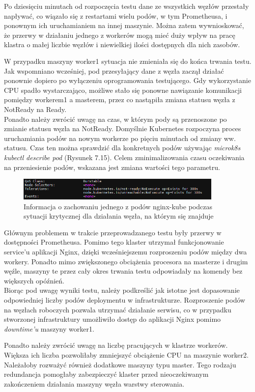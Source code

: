 Po dziesięciu minutach od rozpoczęcia testu dane ze wszystkich węzłów przestały napływać, co wiązało się z restartami wielu podów, w tym Prometheusa, i ponownym ich uruchamianiem na innej maszynie. 
Można zatem wywnioskować, że przerwy w działaniu jednego z workerów mogą mieć duży wpływ na pracę klastra o małej liczbie węzłów i niewielkiej ilości dostępnych dla nich zasobów. 

W przypadku maszyny worker1 sytuacja nie zmieniała się do końca trwania testu. Jak wspomniano wcześniej, pod przesyłający dane z węzła zaczął działać ponownie dopiero po wyłączeniu oprogramowania testującego. Gdy wykorzystanie CPU spadło wystarczająco, możliwe stało się ponowne nawiązanie komunikacji pomiędzy workerem1 a masterem, przez co nastąpiła zmiana statusu węzła z NotReady na Ready.\\

Ponadto należy zwrócić uwagę na czas, w którym pody są przenoszone po zmianie statusu węzła na NotReady. Domyślnie Kubernetes rozpoczyna proces uruchamiania podów na nowym workerze po pięciu minutach od zmiany ww. statusu. Czas ten można sprawdzić dla konkretnych podów używając \textit{microk8s kubectl describe pod} (Rysunek 7.15). Celem zminimalizowania czasu oczekiwania na przeniesienie podów, wskazana jest zmiana wartości tego parametru.

\begin{figure}[H]
    \centering
    \includegraphics[width=0.9\textwidth]{img2/test2/describe-pod.png}
    \caption{Informacja o zachowaniu jednego z podów nginx-kube podczas sytuacji krytycznej dla działania węzła, na którym się znajduje}
\end{figure}

Głównym problemem w trakcie przeprowadzanego testu były przerwy w dostępności Prometheusa. Pomimo tego klaster utrzymał funkcjonowanie service'u aplikacji Nginx, dzięki wcześniejszemu rozproszeniu podów między dwa workery. Ponadto mimo zwiększonego obciążenia procesora na masterze i drugim węźle, maszyny te przez cały okres trwania testu odpowiadały na komendy bez większych opóźnień.\\

Biorąc pod uwagę wyniki testu, należy podkreślić jak istotne jest dopasowanie odpowiedniej liczby podów deploymentu w infrastrukturze. Rozproszenie podów na węzłach roboczych pozwala utrzymać działanie serwisu, co w przypadku stworzonej infrastruktury umożliwiło dostęp do aplikacji Nginx pomimo \textit{downtime'u} maszyny worker1. 

Ponadto należy zwrócić uwagę na liczbę pracujących w klastrze workerów. Większa ich liczba pozwoliłaby zmniejszyć obciążenie CPU na maszynie worker2. Należałoby rozważyć również dodatkowe maszyny typu master. Tego rodzaju redundancja pomogłaby zabezpieczyć klaster przed nieoczekiwanym zakończeniem działania maszyny węzła warstwy sterowania.


